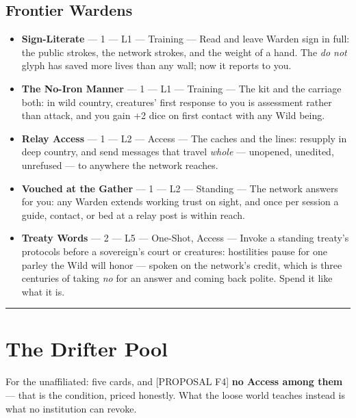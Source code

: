 \section{Frontier Wardens}

\begin{itemize}
    \item \textbf{Sign-Literate} --- 1 --- L1 --- Training --- Read and leave Warden sign in full: the public strokes, the network strokes, and the weight of a hand. The \textit{do not} glyph has saved more lives than any wall; now it reports to you.
    \item \textbf{The No-Iron Manner} --- 1 --- L1 --- Training --- The kit and the carriage both: in wild country, creatures' first response to you is assessment rather than attack, and you gain +2 dice on first contact with any Wild being.
    \item \textbf{Relay Access} --- 1 --- L2 --- Access --- The caches and the lines: resupply in deep country, and send messages that travel \textit{whole} --- unopened, unedited, unrefused --- to anywhere the network reaches.
    \item \textbf{Vouched at the Gather} --- 1 --- L2 --- Standing --- The network answers for you: any Warden extends working trust on sight, and once per session a guide, contact, or bed at a relay post is within reach.
    \item \textbf{Treaty Words} --- 2 --- L5 --- One-Shot, Access --- Invoke a standing treaty's protocols before a sovereign's court or creatures: hostilities pause for one parley the Wild will honor --- spoken on the network's credit, which is three centuries of taking \textit{no} for an answer and coming back polite. Spend it like what it is.
\end{itemize}

\medskip\hrule\medskip

\chapter*{The Drifter Pool}

For the unaffiliated: five cards, and [PROPOSAL F4] \textbf{no Access among them} --- that is the condition, priced honestly. What the loose world teaches instead is what no institution can revoke.


